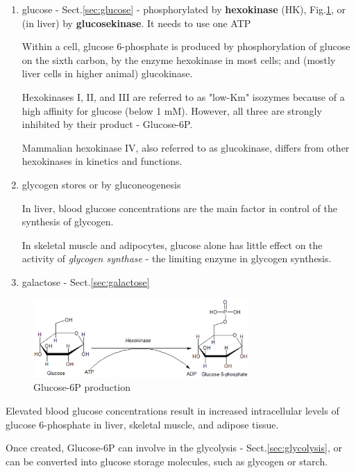 \begin{enumerate}
  
  \item glucose - Sect.\ref{sec:glucose} - phosphorylated by {\bf hexokinase}
  (HK), Fig.\ref{fig:Glucose-6P-production}, or (in liver) by {\bf
  glucosekinase}. It needs to use one ATP

Within a cell, glucose 6-phosphate is produced by phosphorylation of glucose on
the sixth carbon, by the enzyme hexokinase in most cells; and (mostly liver
cells in higher animal) glucokinase.

 Hexokinases I, II, and III are referred to as "low-Km" isozymes because of a
high affinity for glucose (below 1 mM). 
However, all three are strongly inhibited by their product - Glucose-6P.

Mammalian hexokinase IV, also referred to as glucokinase, differs from other
hexokinases in kinetics and functions.

  \item glycogen stores or by gluconeogenesis
  
In liver, blood glucose concentrations are the main factor in control of the
synthesis of glycogen.

In skeletal muscle and adipocytes, glucose alone has little effect on the
activity of {\it glycogen synthase} - the limiting enzyme in glycogen synthesis.

   \item galactose - Sect.\ref{sec:galactose}
\end{enumerate}

\begin{figure}[htb]
  \centerline{\includegraphics[height=3cm]{./images/Glucose-6P-production.eps}}
  \caption{Glucose-6P production}
  \label{fig:Glucose-6P-production}
\end{figure}

Elevated blood glucose concentrations result in increased intracellular levels
of glucose 6-phosphate in liver, skeletal muscle, and adipose tissue.

Once created, Glucose-6P can involve in the glycolysis -
Sect.\ref{sec:glycolysis}, or can be converted into glucose storage molecules,
such as glycogen or starch.

